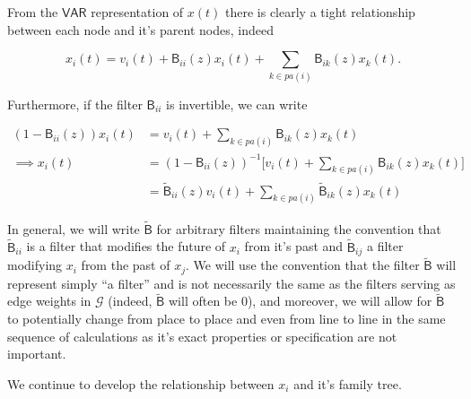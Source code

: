 \documentclass[12pt]{article}
\def\gcg{\mathcal{G}}  %
\def\VAR{\mathsf{VAR}}  %
\def\B{\mathsf{B}}  %
\def\wtB{\widetilde{\B}}  %
\newcommand{\pa}[1]{pa(#1)}  %
\begin{document}

From the $\VAR$ representation of $x(t)$ there is clearly a tight relationship between each node and it's parent nodes, indeed

\begin{equation}
  \label{eqn:parent_expanion}
  x_i(t) = v_i(t) + \B_{ii}(z)x_i(t) + \sum_{k \in \pa{i}}\B_{ik}(z)x_k(t).
\end{equation}

Furthermore, if the filter $\B_{ii}$ is invertible, we can write

\begin{equation*}
  \begin{aligned}
    (1 - \B_{ii}(z))x_i(t) &= v_i(t) + \sum_{k \in \pa{i}}\B_{ik}(z)x_k(t)\\
    \implies x_i(t) &= (1 - \B_{ii}(z))^{-1}\big[v_i(t) + \sum_{k \in \pa{i}}\B_{ik}(z)x_k(t)\big]\\
    &= \wtB_{ii}(z)v_i(t) + \sum_{k \in \pa{i}}\wtB_{ik}(z)x_k(t)
  \end{aligned}
\end{equation*}

In general, we will write $\wtB$ for arbitrary filters maintaining the
convention that $\wtB_{ii}$ is a filter that modifies the future of
$x_i$ from it's past and $\wtB_{ij}$ a filter modifying $x_i$ from the
past of $x_j$.  We will use the convention that the filter
$\widetilde{\B}$ will represent simply ``a filter'' and is not
necessarily the same as the filters serving as edge weights in $\gcg$
(indeed, $\wtB$ will often be $0$), and moreover, we will allow for
$\widetilde{\B}$ to potentially change from place to place and even
from line to line in the same sequence of calculations as it's exact
properties or specification are not important.

We continue to develop the relationship between $x_i$ and it's family tree.
\end{document}
